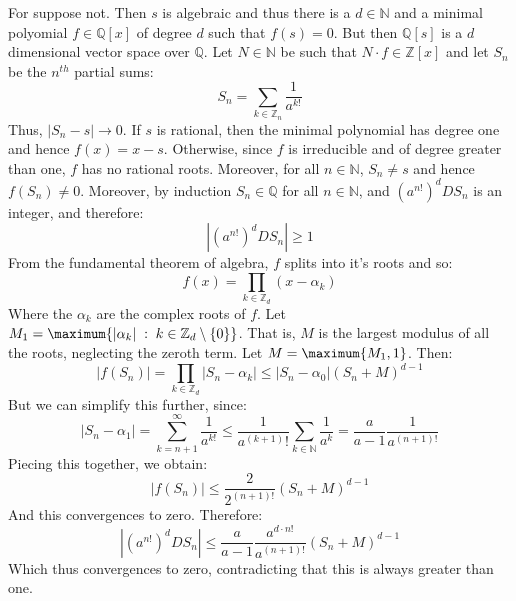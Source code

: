     \begin{bproof}
        For suppose not. Then $s$ is algebraic and thus there is a
        $d\in\mathbb{N}$ and a minimal polyomial $f\in\mathbb{Q}[x]$ of
        degree $d$ such that $f(s)=0$. But then $\mathbb{Q}[s]$ is a
        $d$ dimensional vector space over $\mathbb{Q}$. Let $N\in\mathbb{N}$
        be such that $N\cdot{f}\in\mathbb{Z}[x]$ and let $S_{n}$ be the
        $n^{th}$ partial sums:
        \begin{equation}
            S_{n}=\sum_{k\in\mathbb{Z}_{n}}\frac{1}{a^{k!}}
        \end{equation}
        Thus, $|S_{n}-s|\rightarrow{0}$. If $s$ is rational, then the
        minimal polynomial has degree one and hence $f(x)=x-s$. Otherwise,
        since $f$ is irreducible and of degree greater than one, $f$ has no
        rational roots. Moreover, for all $n\in\mathbb{N}$, $S_{n}\ne{s}$
        and hence $f(S_{n})\ne{0}$. Moreover, by induction
        $S_{n}\in\mathbb{Q}$ for all $n\in\mathbb{N}$, and
        $(a^{n!})^{d}DS_{n}$ is an integer, and therefore:
        \begin{equation}
            |(a^{n!})^{d}DS_{n}|\geq{1}
        \end{equation}
        From the fundamental theorem of algebra, $f$ splits into it's roots
        and so:
        \begin{equation}
            f(x)=\prod_{k\in\mathbb{Z}_{d}}(x-\alpha_{k})
        \end{equation}
        Where the $\alpha_{k}$ are the complex roots of $f$. Let
        $M_{1}=\maximum{|\alpha_{k}|\;:\;k\in\mathbb{Z}_{d}\setminus\{0\}}$.
        That is, $M$ is the largest modulus of all the roots, neglecting the
        zeroth term. Let $M=\maximum{M_{1},1}$. Then:
        \begin{equation}
            |f(S_{n})|=\prod_{k\in\mathbb{Z}_{d}}|S_{n}-\alpha_{k}|
                \leq|S_{n}-\alpha_{0}|(S_{n}+M)^{d-1}
        \end{equation}
        But we can simplify this further, since:
        \begin{equation}
            |S_{n}-\alpha_{1}|=\sum_{k=n+1}^{\infty}\frac{1}{a^{k!}}
            \leq\frac{1}{a^{(k+1)}!}\sum_{k\in\mathbb{N}}\frac{1}{a^{k}}
            =\frac{a}{a-1}\frac{1}{a^{(n+1)!}}
        \end{equation}
        Piecing this together, we obtain:
        \begin{equation}
            |f(S_{n})|\leq\frac{2}{2^{(n+1)!}}(S_{n}+M)^{d-1}
        \end{equation}
        And this convergences to zero. Therefore:
        \begin{equation}
            |(a^{n!})^{d}DS_{n}|\leq\frac{a}{a-1}
                \frac{a^{d\cdot{n!}}}{a^{(n+1)!}}(S_{n}+M)^{d-1}
        \end{equation}
        Which thus convergences to zero, contradicting that this is always
        greater than one.
    \end{bproof}
